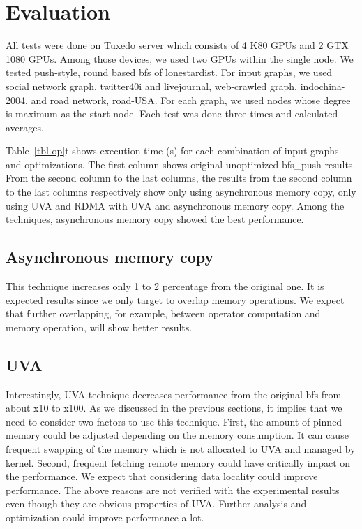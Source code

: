 \section{Evaluation}
\label{evaluation}
All tests were done on Tuxedo server which consists of 4 K80 GPUs and 2 GTX 1080 GPUs.
Among those devices, we used two GPUs within the single node.
We tested push-style, round based bfs of lonestardist. For input graphs, we used 
social network graph, twitter40i and livejournal, web-crawled graph, indochina-2004, and road network, road-USA. 
For each graph, we used nodes whose degree is maximum as the start node. Each test was done three times and 
calculated averages.



Table~\ref{tbl-op}t shows execution time (s) for each combination of input graphs and optimizations.
The first column shows original unoptimized bfs\_push results. From the second column to the last columns,
the results from the second column to the last columns respectively show 
only using asynchronous memory copy, only using UVA and RDMA with UVA and asynchronous memory copy. 
Among the techniques, asynchronous memory copy showed the best performance.

\subsection{Asynchronous memory copy}
This technique increases only 1 to 2 percentage from the original one.
It is expected results since we only target to overlap memory operations.
We expect that further overlapping, for example, between operator computation and memory operation, 
will show better results.

\subsection{UVA}
Interestingly, UVA technique decreases performance from the original bfs from about x10 to x100.
As we discussed in the previous sections, it implies that we need to consider two factors to use this technique.
First, the amount of pinned memory could be adjusted depending on the memory consumption.
It can cause frequent swapping of the memory which is not allocated to UVA and managed by kernel.
Second, frequent fetching remote memory could have critically impact on the performance.
We expect that considering data locality could improve performance. 
The above reasons are not verified with the experimental results even though they are obvious properties of UVA.
Further analysis and optimization could improve performance a lot.

